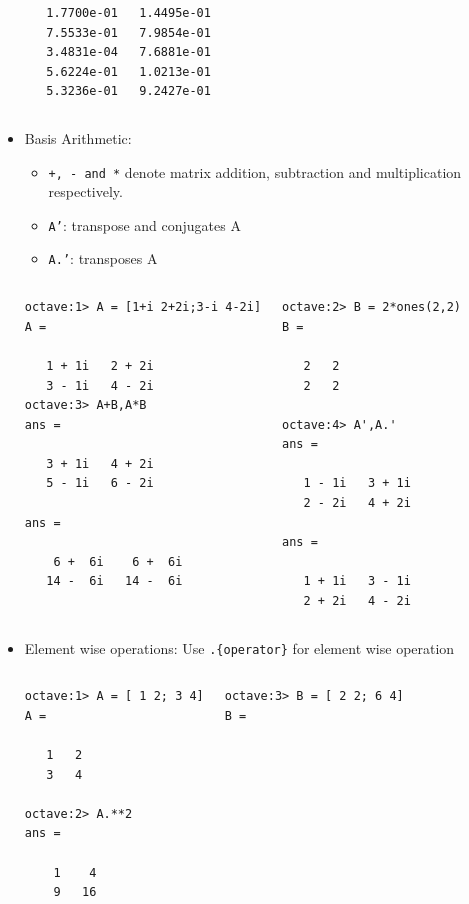 \documentclass[t,compress,xcolor=svgnames]{beamer}
\begin{document}
\begin{frame}
\begin{itemize}
{\begin{columns}
\begin{verbatim}
   1.7700e-01   1.4495e-01
   7.5533e-01   7.9854e-01
   3.4831e-04   7.6881e-01
   5.6224e-01   1.0213e-01
   5.3236e-01   9.2427e-01
      \end{verbatim}
    \end{columns}
    }
    \item Basis Arithmetic:
    \begin{itemize}
      \item \texttt{+, - and *} denote matrix addition, subtraction and multiplication respectively.
      \item \texttt{A'}: transpose and conjugates A
      \item \texttt{A.'}: transposes A
    \end{itemize}
    {\tiny
      \begin{columns}
        \column{4cm}
        \begin{verbatim}
octave:1> A = [1+i 2+2i;3-i 4-2i]
A =

   1 + 1i   2 + 2i
   3 - 1i   4 - 2i
octave:3> A+B,A*B
ans =

   3 + 1i   4 + 2i
   5 - 1i   6 - 2i

ans =

    6 +  6i    6 +  6i
   14 -  6i   14 -  6i
        \end{verbatim}
        \column{4cm}
        \begin{verbatim}
octave:2> B = 2*ones(2,2) 
B =

   2   2
   2   2

octave:4> A',A.'
ans =

   1 - 1i   3 + 1i
   2 - 2i   4 + 2i

ans =

   1 + 1i   3 - 1i
   2 + 2i   4 - 2i
        \end{verbatim}
      \end{columns}
    }
    \framebreak
    \item Element wise operations: Use \texttt{.\{operator\}} for element wise operation
    {\tiny
      \begin{columns}
        \column{4cm}
        \begin{verbatim}
octave:1> A = [ 1 2; 3 4]
A =

   1   2
   3   4

octave:2> A.**2
ans =

    1    4
    9   16
        \end{verbatim}
        \column{4cm}
        \begin{verbatim}
octave:3> B = [ 2 2; 6 4]
B =


\end{verbatim}
\end{columns}}
\end{itemize}
\end{frame}
\end{document}
